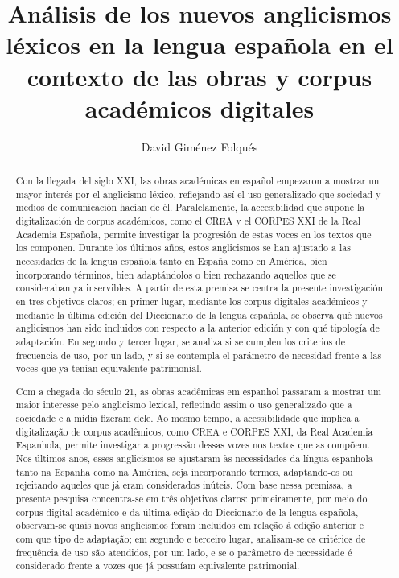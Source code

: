 \documentclass{textolivre}
\title{Análisis de los nuevos anglicismos léxicos en la lengua española en el contexto de las obras y corpus académicos digitales}
\author[1]{David Giménez Folqués}
\affil[1]{Universidad de Valencia, Espanha. Email: \url{david.gimenez-folques@uv.es} \orcid{0000-0002-9059-5591}}
\begin{document}
\maketitle

\begin{poliabstract}
\begin{abstract}
Con la llegada del siglo XXI, las obras académicas en español empezaron a mostrar un mayor interés por el anglicismo léxico, reflejando así el uso generalizado que sociedad y medios de comunicación hacían de él. Paralelamente, la accesibilidad que supone la digitalización de corpus académicos, como el CREA y el CORPES XXI de la Real Academia Española, permite investigar la progresión de estas voces en los textos que los componen. Durante los últimos años, estos anglicismos se han ajustado a las necesidades de la lengua española tanto en España como en América, bien incorporando términos, bien adaptándolos o bien rechazando aquellos que se consideraban ya inservibles. A partir de esta premisa se centra la presente investigación en tres objetivos claros; en primer lugar, mediante los corpus digitales académicos y mediante la última edición del Diccionario de la lengua española, se observa qué nuevos anglicismos han sido incluidos con respecto a la anterior edición y con qué tipología de adaptación. En segundo y tercer lugar, se analiza si se cumplen los criterios de frecuencia de uso, por un lado, y si se contempla el parámetro de necesidad frente a las voces que ya tenían equivalente patrimonial.

\end{abstract}

\begin{portuguese}
\begin{abstract}
Com a chegada do século 21, as obras acadêmicas em espanhol passaram a mostrar um maior interesse pelo anglicismo lexical, refletindo assim o uso generalizado que a sociedade e a mídia fizeram dele. Ao mesmo tempo, a acessibilidade que implica a digitalização de corpus acadêmicos, como CREA e CORPES XXI, da Real Academia Espanhola, permite investigar a progressão dessas vozes nos textos que as compõem. Nos últimos anos, esses anglicismos se ajustaram às necessidades da língua espanhola tanto na Espanha como na América, seja incorporando termos, adaptando-os ou rejeitando aqueles que já eram considerados inúteis. Com base nessa premissa, a presente pesquisa concentra-se em três objetivos claros: primeiramente, por meio do corpus digital acadêmico e da última edição do Diccionario de la lengua española, observam-se quais novos anglicismos foram incluídos em relação à edição anterior e com que tipo de adaptação; em segundo e terceiro lugar, analisam-se os critérios de frequência de uso são atendidos, por um lado, e se o parâmetro de necessidade é considerado frente a vozes que já possuíam equivalente patrimonial.


\end{abstract}
\end{portuguese}
\end{poliabstract}
\end{document}

